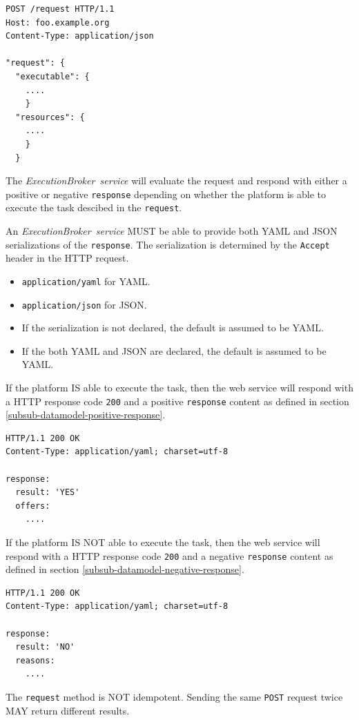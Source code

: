 \documentclass[11pt,a4paper]{ivoa}
\newcommand{\json} {JSON}
\newcommand{\yaml} {YAML}
\newcommand{\webservice} {web service}
\newcommand{\execbrokerservice}[1] {\textit{ExecutionBroker~service#1}}
\newcommand{\codeword}[1] {\texttt{#1}}
\begin{document}
\begin{lstlisting}[]
POST /request HTTP/1.1
Host: foo.example.org
Content-Type: application/json

"request": {
  "executable": {
    ....
    }
  "resources": {
    ....
    }
  }
\end{lstlisting}

The \execbrokerservice{} will evaluate the request and respond with either a positive
or negative \codeword{response} depending on whether the platform is able to execute the
task descibed in the \codeword{request}.

An \execbrokerservice{} MUST be able to provide both \yaml{} and \json{} serializations
of the \codeword{response}.
The serialization is determined by the \codeword{Accept} header in the HTTP request.
\begin{itemize}
    \item \codeword{application/yaml} for \yaml{}.
    \item \codeword{application/json} for \json.
    \item If the serialization is not declared, the default is assumed to be \yaml{}.
    \item If the both \yaml{} and \json{} are declared, the default is assumed to be \yaml{}.
\end{itemize}

If the platform IS able to execute the task, then the \webservice{} will respond with a
HTTP response code \codeword{200} and a positive \codeword{response} content as defined
in section \ref{subsub-datamodel-positive-response}.

\begin{lstlisting}[]
HTTP/1.1 200 OK
Content-Type: application/yaml; charset=utf-8

response:
  result: 'YES'
  offers:
    ....
\end{lstlisting}

If the platform IS NOT able to execute the task, then the \webservice{} will respond with a
HTTP response code \codeword{200} and a negative \codeword{response} content as defined
in section \ref{subsub-datamodel-negative-response}.

\begin{lstlisting}[]
HTTP/1.1 200 OK
Content-Type: application/yaml; charset=utf-8

response:
  result: 'NO'
  reasons:
    ....
\end{lstlisting}

The \codeword{request} method is NOT idempotent. Sending the same \codeword{POST} request
twice MAY return different results.
\end{document}
